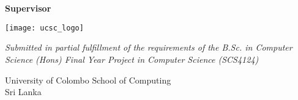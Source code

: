 \begin{titlepage}
    \begin{center}
        
        \vspace{1cm}
        
        {\LARGE
        \textsc{\titlename}}\\
        
        \vspace{3cm}
        
        {\bf{\authorname}}\\
        \authorindexno
        
        \vspace{1.5cm}
        
        {\bf{Supervisor}} \\
        \supervisorname
        
        \vspace{3cm}
        
        \texttt{[image: ucsc\_logo]}
        \vspace{0.5cm}
        
        {\em Submitted in partial fulfillment of the requirements of the B.Sc. in Computer Science (Hons) Final Year Project in Computer Science (SCS4124)}
        
        \vspace{1cm}
        
        University of Colombo School of Computing \\
        Sri Lanka \\
        \titledate

    \end{center}
\end{titlepage}

